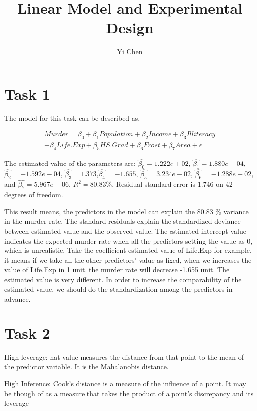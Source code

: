 \documentclass[doc,biblatex,apacite]{apa6}
\author{Yi Chen}
\affiliation{Teachers College, Columbia University}
\title{Linear Model and Experimental Design}
\begin{document}
\maketitle

\section{Task 1}

The model for this task can be described as,

\begin{equation} \label{eq1}
    \begin{split}
        Murder = \beta_0 + \beta_1 Population + \beta_2 Income + \beta_3 Illiteracy  \\
        + \beta_4 Life.Exp + \beta_5 HS.Grad + \beta_6 Frost + \beta_7 Area + \epsilon
    \end{split}
    \end{equation}


The estimated value of the parameters are: $\hat{\beta_0}=1.222e+02$, $\hat{\beta_1}=1.880e-04$, $\hat{\beta_2}=-1.592e-04$, $\hat{\beta_3}=1.373$,$\hat{\beta_4}=-1.655$, $\hat{\beta_5}=3.234e-02$, $\hat{\beta_6}= -1.288e-02$, and $\hat{\beta_7} = 5.967e-06$.
$R^2 = 80.83\%$, Residual standard error is 1.746 on 42 degrees of freedom.

This result means, the predictors in the model can explain the 80.83 \% variance in the murder rate. The standard residuals explain the standardized deviance between estimated value and the observed value. 
The estimated intercept value indicates the expected murder rate when all the predictors setting the value as 0, which is unrealistic.
Take the coefficient estimated value of Life.Exp for example, it means if we take all the other predictors' value as fixed, when we increases the value of Life.Exp in 1 unit, the murder rate will decrease  -1.655 unit.
The estimated value is very different. 
In order to increase the comparability of the estimated value, we should do the standardization among the predictors in advance.


\section{Task 2}

High leverage: hat-value measures the distance from that point to the mean of the predictor variable. It is the
Mahalanobis distance.

High Inference: Cook’s distance is a measure of the influence of a point. It may be though of as a measure that takes
the product of a point’s discrepancy and its leverage
\end{document}
